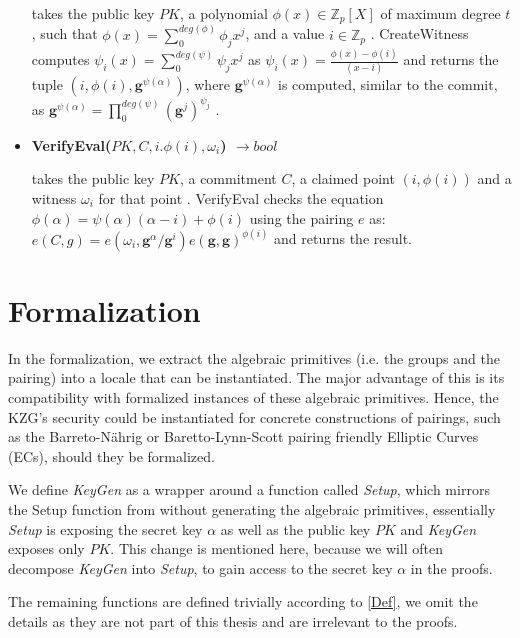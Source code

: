 \begin{itemize}
    takes the public key $PK$, a polynomial $\phi(x) \in \mathbb{Z}_p[X]$ of maximum degree $t$, such that $\phi(x)=\sum_{0}^{deg(\phi)}\phi_jx^j$, and a value $i\in\mathbb{Z}_p$ \parencite{KZG}. CreateWitness computes $\psi_i(x)=\sum_{0}^{deg(\psi)}\psi_jx^j$ as $\psi_i(x)=\frac{\phi(x)-\phi(i)}{(x-i)}$ and returns the tuple $(i,\phi(i),\mathbf{g}^{\psi(\alpha)})$, where $\mathbf{g}^{\psi(\alpha)}$ is computed, similar to the commit, as $\mathbf{g}^{\psi(\alpha)} = \prod_{0}^{deg(\psi)}(\mathbf{g}^j)^{\psi_j}$ \parencite{KZG}.
    \item \textbf{VerifyEval($PK,C,i.\phi(i),\omega_i$) $\rightarrow bool$}

    takes the public key $PK$, a commitment $C$, a claimed point $(i,\phi(i))$ and a witness $\omega_i$ for that point \parencite{KZG}. VerifyEval checks the equation $\phi(\alpha)=\psi(\alpha)(\alpha-i)+\phi(i)$ using the pairing $e$ as: $e(C,g) = e(\omega_i,\mathbf{g}^\alpha/\mathbf{g}^i)e(\mathbf{g},\mathbf{g})^{\phi(i)}$ and returns the result.
\end{itemize}

\section*{Formalization}

In the formalization, we extract the algebraic primitives (i.e. the groups and the pairing) into a locale that can be instantiated. The major advantage of this is its compatibility with formalized instances of these algebraic primitives. Hence, the KZG's security could be instantiated for concrete constructions of pairings, such as the Barreto-Nährig\parencite{BN-EC} or Baretto-Lynn-Scott\parencite{BLS-EC} pairing friendly Elliptic Curves (ECs), should they be formalized.

We define \textit{KeyGen} as a wrapper around a function called \textit{Setup}, which mirrors the Setup function from \parencite{KZG} without generating the algebraic primitives, essentially \textit{Setup} is exposing the secret key $\alpha$ as well as the public key $PK$ and \textit{KeyGen} exposes only $PK$. This change is mentioned here, because we will often decompose \textit{KeyGen} into \textit{Setup}, to gain access to the secret key $\alpha$ in the proofs.

The remaining functions are defined trivially according to \ref{Def}, we omit the details as they are not part of this thesis and are irrelevant to the proofs.
